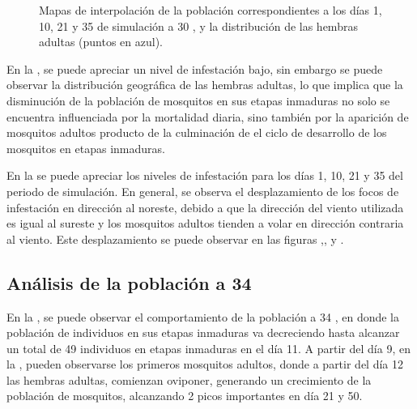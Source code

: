 \begin{figure}[!htbp]
    \caption{\label{fig:niveles-infestacion-30} Mapas de interpolación de la población correspondientes a los días 1, 10, 21 y 35 de simulación a 30 \textcelsius, y la distribución de las hembras adultas (puntos en azul). }
\end{figure}

En la , se puede apreciar un nivel de infestación bajo, sin
embargo se puede observar la distribución geográfica de las hembras adultas, lo que implica que la
disminución de la población de mosquitos en sus etapas inmaduras no solo se encuentra influenciada
por la mortalidad diaria, sino también por la aparición de mosquitos adultos producto de la culminación de el ciclo de desarrollo de los mosquitos en etapas inmaduras.

En la  se puede apreciar los niveles de infestación
para los días 1, 10, 21 y 35 del periodo de simulación. En general, se observa el
desplazamiento de los focos de infestación en dirección al noreste, debido a que la dirección del
viento utilizada es igual al sureste y los mosquitos adultos tienden a volar en dirección
contraria al viento. Este desplazamiento se puede observar en las figuras
,,
 y .

\subsection{Análisis de la población a 34\textcelsius}
En la , se puede observar el comportamiento de la población a
34 \textcelsius, en donde la población de individuos en sus etapas inmaduras va decreciendo hasta
alcanzar un total de 49 individuos en etapas inmaduras en el día 11. A partir del día 9, en la
, pueden observarse los primeros mosquitos adultos, donde a
partir del día 12 las hembras adultas, comienzan oviponer, generando un crecimiento de la
población de mosquitos, alcanzando 2 picos importantes en día 21 y 50.

